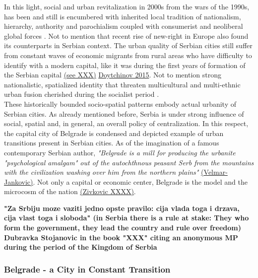 \documentclass[11pt]{report}
\begin{document}
In this light, social and urban revitalization in 2000s from the wars of the 1990s, has been and still is encumbered with inherited local tradition of nationalism, hierarchy, authority and parochialism coupled with consumerist and neoliberal global forces \href{}{\citealt{stupar_aleksandra_recreating_2004}}.
Not to mention that recent rise of new-right in Europe also found its counterparts in Serbian context.
The urban quality of Serbian cities still suffer from constant waves of economic migrants from rural areas who have difficulty to identify with a modern capital, like it was during the first years of formation of the Serbian capital \href{}{(see XXX)} \href{}{Doytchinov 2015}. Not to mention strong nationalistic, spatialized identity \href{}{\citealt{savic_where_2014}} that threaten multicultural and multi-ethnic urban fusion cherished during the socialist period \href{}{\citealt{stupar_aleksandra_recreating_2004}}.
\\
These historically bounded socio-spatial patterns embody actual urbanity of Serbian cities. As already mentioned before, Serbia is under strong influence of social, spatial and, in general, an overall policy of centralization. In this respect, the capital city of Belgrade is condensed and depicted example of urban transitions present in Serbian cities.
As of the imagination of a famous contemporary Serbian author, \textit{"Belgrade is a mill for producing the urbanite "psychological amalgam" out of the autochthnous peasant Serb from the mountains with the civilization washing over him from the northern plains"} \href{}{(Velmar-Jankovic)}. Not only a capital or economic center, Belgrade is the model and the microcosm of the nation \href{}{(Zivkovic XXXX)}.

\textbf{"Za Srbiju moze vaziti jedno opste pravilo: cija vlada toga i drzava, cija vlast toga i sloboda" (in Serbia there is a rule at stake: They who form the government, they lead the country and rule over freedom) Dubravka Stojanovic in the book "XXX" citing an anonymous MP during the period of the Kingdom of Serbia}

\subsubsection{Belgrade - a City in Constant Transition}
\end{document}
